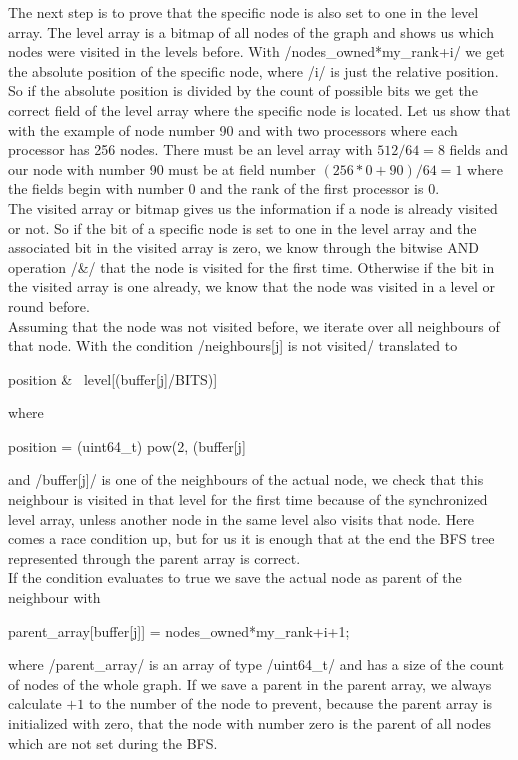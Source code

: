 \documentclass[12pt,a4paper]{article}
\begin{document}
The next step is to prove that the specific node is also set to one in the level array. The level array is a bitmap of all nodes of the graph and shows us which nodes were visited in the levels before. With \cinline/nodes_owned*my_rank+i/ we get the absolute position of the specific node, where \cinline/i/ is just the relative position. So if the absolute position is divided by the count of possible bits we get the correct field of the level array where the specific node is located. Let us show that with the example of node number 90 and with two processors where each processor has 256 nodes. There must be an level array with \(512/64 = 8\) fields and our node with number 90 must be at field number \((256*0+90) / 64 = 1\) where the fields begin with number 0 and the rank of the first processor is 0.\\
The visited array or bitmap gives us the information if a node is already visited or not. So if the bit of a specific node is set to one in the level array and the associated bit in the visited array is zero, we know through the bitwise AND operation \cinline/&/ that the node is visited for the first time. Otherwise if the bit in the visited array is one already, we know that the node was visited in a level or round before.\\
Assuming that the node was not visited before, we iterate over all neighbours of that node. With the condition \cinline/neighbours[j] is not visited/ translated to
\begin{ccode}
position & ~level[(buffer[j]/BITS)]
\end{ccode}
where
\begin{ccode}
position = (uint64_t) pow(2, (buffer[j] %
\end{ccode}
and \cinline/buffer[j]/ is one of the neighbours of the actual node, we check that this neighbour is visited in that level for the first time because of the synchronized level array, unless another node in the same level also visits that node. Here comes a race condition up, but for us it is enough that at the end the BFS tree represented through the parent array is correct.\\
If the condition evaluates to true we save the actual node as parent of the neighbour with
\begin{ccode}
parent_array[buffer[j]] = nodes_owned*my_rank+i+1;
\end{ccode}
where \cinline/parent_array/ is an array of type \cinline/uint64_t/ and has a size of the count of nodes of the whole graph. If we save a parent in the parent array, we always calculate \(+1\) to the number of the node to prevent, because the parent array is initialized with zero, that the node with number zero is the parent of all nodes which are not set during the BFS.\\
\end{document}
